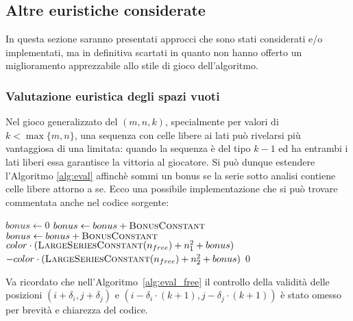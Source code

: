 \documentclass{article}
\begin{document}
\subsection*{Altre euristiche considerate}

In questa sezione saranno presentati approcci che sono stati considerati
e/o implementati, ma in definitiva scartati in quanto non hanno offerto un
miglioramento apprezzabile allo stile di gioco dell'algoritmo.

\subsubsection*{Valutazione euristica degli spazi vuoti}

Nel gioco generalizzato del $(m, n, k)$, specialmente per valori di $k < \max\{m,n\}$,
una sequenza con celle libere ai lati pu\`o rivelarsi pi\`u vantaggiosa di una
limitata: quando la sequenza \`e del tipo $k-1$ ed ha entrambi i lati liberi
essa garantisce la vittoria al giocatore. Si pu\`o dunque estendere l'Algoritmo
\vref{alg:eval} affinch\`e sommi un bonus se la serie sotto analisi contiene celle
libere attorno a se. Ecco una possibile implementazione che si pu\`o trovare
commentata anche nel codice sorgente:

\begin{algorithm}[H]
  \caption{Valutazione delle serie favorendo spazi liberi adiacenti}
  \label{alg:eval_free}
  \begin{algorithmic}[0]
    \State $bonus \gets 0$
      \State $bonus \gets bonus + \textsc{BonusConstant}$
    \EndIf
      \State $bonus \gets bonus + \textsc{BonusConstant}$
    \EndIf
    \Statex
      \State \Return $color \cdot (\Call{LargeSeriesConstant}{n_{free}} + n_1^2 + bonus)$
    \State \Return $-color \cdot (\Call{LargeSeriesConstant}{n_{free}} + n_2^2 + bonus)$
    \Else
      \State \Return $0$
    \EndIf
    \EndProcedure
  \end{algorithmic}
\end{algorithm}

Va ricordato che nell'Algoritmo~\ref{alg:eval_free} il controllo della validit\`a delle
posizioni $(i + \delta_i, j + \delta_j)$ e $(i - \delta_i \cdot (k+1), j - \delta_j \cdot (k+1))$
\`e stato omesso per brevit\`a e chiarezza del codice.
\end{document}
